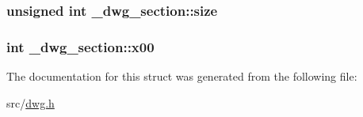 \hypertarget{struct__dwg__section_a62d6f504db4ba0a86f1e506ae7937dda}{
\subsubsection[{size}]{\setlength{\rightskip}{0pt plus 5cm}unsigned int {\bf \-\_\-dwg\-\_\-section\-::size}}}\label{struct__dwg__section_a62d6f504db4ba0a86f1e506ae7937dda}
\hypertarget{struct__dwg__section_af5a645c9c8aec90c3f542367183517ef}{
\subsubsection[{x00}]{\setlength{\rightskip}{0pt plus 5cm}int {\bf \-\_\-dwg\-\_\-section\-::x00}}}\label{struct__dwg__section_af5a645c9c8aec90c3f542367183517ef}


\-The documentation for this struct was generated from the following file\-:\begin{DoxyCompactItemize}
\item 
src/\hyperlink{dwg_8h}{dwg.\-h}\end{DoxyCompactItemize}
